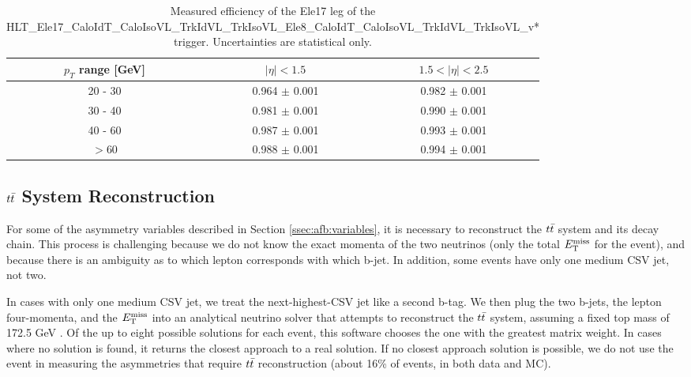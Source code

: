 \begin{table}[htbp]
\begin{center}
\footnotesize
\caption{Measured efficiency of the Ele17 leg of the
HLT\_Ele17\_CaloIdT\_CaloIsoVL\_TrkIdVL\_TrkIsoVL\_Ele8\_CaloIdT\_CaloIsoVL\_TrkIdVL\_TrkIsoVL\_v*
trigger. Uncertainties are statistical only.}
\label{tab:afb:trigeff:ele17}
\begin{tabular}{c|c|c}
\hline
\hline
  $p_T$ range [GeV] & $|\eta|<1.5$ & $1.5<|\eta|<2.5$\\
\hline
  20 -  30  & 0.964 $\pm$ 0.001 & 0.982 $\pm$ 0.001\\
  30 -  40  & 0.981 $\pm$ 0.001 & 0.990 $\pm$ 0.001\\
  40 -  60  & 0.987 $\pm$ 0.001 & 0.993 $\pm$ 0.001\\
  $>$60     & 0.988 $\pm$ 0.001 & 0.994 $\pm$ 0.001\\
\hline
\hline
\end{tabular}
\end{center}
\end{table}


\subsection{\texorpdfstring{$t\bar{t}$}{ttbar} System Reconstruction}
\label{ssec:afb:ttbarreconstruction}

For some of the asymmetry variables described in Section
\ref{ssec:afb:variables}, it is necessary to reconstruct the $t\bar{t}$
system and its decay chain. This process is challenging because we do not
know the exact momenta of the two neutrinos (only the total $E_\text{T}^\text{miss}$ for
the event), and because there is an ambiguity as to which lepton
corresponds with which b-jet. In addition, some events have only one
medium CSV jet, not two.

In cases with only one medium CSV jet, we treat the next-highest-CSV
jet like a second b-tag. We then plug the two b-jets, the lepton
four-momenta, and the $E_\text{T}^\text{miss}$ into an analytical neutrino solver that
attempts to reconstruct the $t\bar{t}$ system, assuming a fixed top mass
of 172.5 GeV \cite{nusolver}. Of the up to eight possible solutions
for each event, this software chooses the one with the greatest matrix
weight. In cases where no solution is found, it returns the closest
approach to a real solution. If no closest approach solution is
possible, we do not use the event in measuring the asymmetries that
require $t\bar{t}$ reconstruction (about 16\% of events, in both data
and MC).

